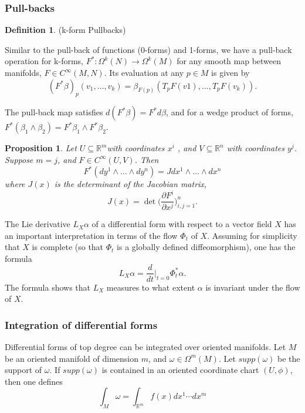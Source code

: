 \documentclass{article}
\newtheorem{proposition}{Proposition}[theorem]
\theoremstyle{definition}
\newtheorem{defn}[theorem]{Definition}
\newenvironment{definition}
  {\vspace{8pt}\begin{mdframed}[backgroundcolor=blueish,innertopmargin=4]\begin{defn}}
  {\end{defn}\end{mdframed}\vspace{4pt}}
\begin{document}
\subsubsection{Pull-backs}

\begin{definition} (k-form Pullbacks)

Similar to the pull-back of functions (0-forms) and 1-forms, we have a pull-back operation for k-forms, $F^* : \Omega^k (N) \rightarrow \Omega^k (M)$ for any smooth map between manifolds, $F \in C^\infty(M,N)$. Its evaluation at any $p \in M$ is given by
\[
(F^* \beta )_p(v_1,\dots, v_k) = \beta_{F(p)} (T_pF(v1),\dots,T_pF(v_k)).
\]
\end{definition}

The pull-back map satisfies $d(F^*\beta) = F^*d\beta$, and for a wedge product of forms, $F^* (\beta_1 \wedge \beta_2) = F^* \beta_1 \wedge F^* \beta_2$.

\begin{proposition}

Let $U \subseteq \mathbb R^m $with coordinates $x^i$ , and $V \subseteq \mathbb R^n $ with coordinates $y^j $. Suppose $m = j$, and $F \in C^\infty(U,V)$. Then 
\[
F^* (dy^1 \wedge \dots \wedge dy^n ) = J dx^ 1 \wedge \dots \wedge dx^n
\]
where $J(x)$ is the determinant of the Jacobian matrix, 
\[
    J(x) = \det \bigg (\frac{\partial F^i}{\partial  x^j} \bigg ) ^n_{i, j=1}.
\]

\end{proposition}

The Lie derivative $L_X \alpha $ of a differential form with respect to a vector field $X$ has an important interpretation in terms of the flow $\Phi_t$ of $X$. Assuming for simplicity that $X$ is complete (so that $\Phi_t$ is a globally defined diffeomorphism), one has the formula 
\[
    L_X\alpha = \frac{d}{dt} \Bigr |_{t=0} \Phi^*_t \alpha.
\]
The formula shows that $L_X$ measures to what extent $\alpha$ is invariant under the flow of $X$.

\subsubsection{Integration of differential forms}

Differential forms of top degree can be integrated over oriented manifolds. Let $M$ be an oriented manifold of dimension $m$, and $\omega \in \Omega^m(M)$. Let $supp(\omega)$ be the support of $\omega$. If $supp(\omega)$ is contained in an oriented coordinate chart $(U,\phi)$, then one defines
\[
\int_M \omega = \int_{\mathbb R^m} f(x)dx^1\cdots dx^m 
\]
\end{document}
